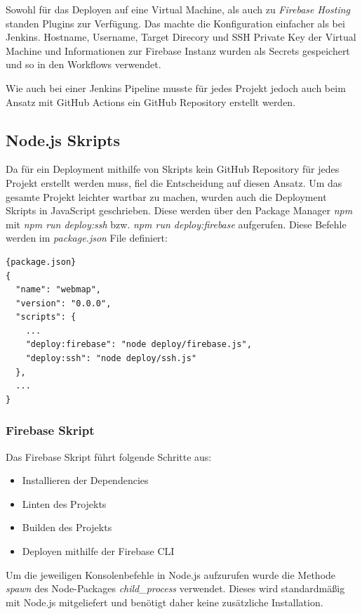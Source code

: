 Sowohl für das Deployen auf eine Virtual Machine, als auch zu \textit{Firebase Hosting}
standen Plugins zur Verfügung.
Das machte die Konfiguration einfacher als bei Jenkins.
Hostname, Username, Target Direcory und SSH Private Key der Virtual Machine und Informationen zur Firebase Instanz
wurden als Secrets gespeichert und so in den Workflows verwendet.

Wie auch bei einer Jenkins Pipeline musste für jedes Projekt jedoch auch beim
Ansatz mit GitHub Actions ein GitHub Repository erstellt werden.

\subsection{Node.js Skripts}
Da für ein Deployment mithilfe von Skripts kein GitHub Repository für jedes Projekt erstellt werden muss,
fiel die Entscheidung auf diesen Ansatz.
Um das gesamte Projekt leichter wartbar zu machen, wurden auch die Deployment Skripts in JavaScript geschrieben.
Diese werden über den Package Manager \textit{npm} mit \textit{npm run deploy:ssh} bzw.
\textit{npm run deploy:firebase} aufgerufen.
Diese Befehle werden im \textit{package.json} File definiert:

\begin{lstlisting}[label={lst:package.json}]{package.json}
{
  "name": "webmap",
  "version": "0.0.0",
  "scripts": {
    ...
    "deploy:firebase": "node deploy/firebase.js",
    "deploy:ssh": "node deploy/ssh.js"
  },
  ...
}
\end{lstlisting}

\subsubsection{Firebase Skript}
Das Firebase Skript führt folgende Schritte aus:

\begin{itemize}
    \item Installieren der Dependencies
    \item Linten des Projekts
    \item Builden des Projekts
    \item Deployen mithilfe der Firebase CLI
\end{itemize}

Um die jeweiligen Konsolenbefehle in Node.js aufzurufen wurde die Methode \textit{spawn} des Node-Packages
\textit{child\_process} verwendet.
Dieses wird standardmäßig mit Node.js mitgeliefert und benötigt daher keine zusätzliche Installation.

